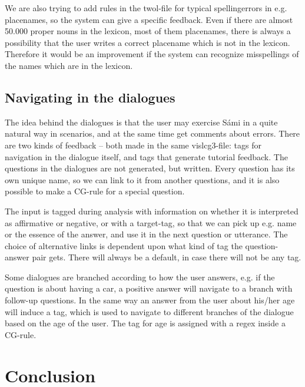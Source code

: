 \documentclass[11pt]{article}
\begin{document}
We are also trying to add rules in the twol-file for typical spellingerrors in e.g. placenames, so the system can give a specific feedback. Even if there are almost 50.000 proper nouns in the lexicon, most of them placenames, there is always a possibility that the user writes a correct placename which is not in the lexicon. Therefore it would be an improvement if the system can recognize misspellings of the names which are in the lexicon.


\subsection{Navigating in the dialogues}
The idea behind the dialogues is that the user may exercise Sámi in a quite natural way in scenarios, and at the same time get comments about errors. There are two kinds of feedback -- both made in the same vislcg3-file: tags for navigation in the dialogue itself, and tags that generate tutorial feedback. The questions in the dialogues are not generated, but written. Every question has its own unique name, so we can link to it from another questions, and it is also possible to make a CG-rule for a special question.   

The input is tagged during analysis with information on whether it is interpreted as affirmative or negative, or with a target-tag, so that we can pick up e.g. name or the essence of the answer, and use it in the next question or utterance. The choice of alternative links is dependent upon what kind of tag the question-answer pair gets. There will always be a default, in case there will not be any tag. 

Some dialogues are branched according to how the user answers, e.g. if the question is about having a car, a positive answer will navigate to a branch with follow-up questions. In the same way an answer from the user about his/her age will induce a tag, which is used to navigate to different branches of the dialogue based on the age of the user. The tag for age is assigned with a regex inside a CG-rule.
 
\section{Conclusion}
\end{document}
